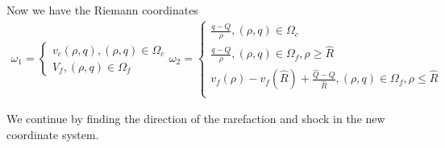 \documentclass{article}
\numberwithin{equation}{section}
\begin{document}
Now we have the Riemann coordinates
\begin{align*}
    \omega_1 = \begin{cases}
    v_c(\rho, q), (\rho, q) \in \Omega_c \\
    V_f, (\rho, q) \in \Omega_f
    \end{cases}
    \omega_2 = \begin{cases}
    \frac{q-Q}{\rho}, (\rho, q) \in \Omega_c \\
    \frac{q-Q}{\rho}, (\rho, q) \in \Omega_f, \rho \geq \hat R \\
    v_f(\rho) - v_f(\hat R) + \frac{\hat Q - Q}{\hat R }, (\rho, q) \in \Omega_f, \rho \leq \hat R \\
    \end{cases}
\end{align*}

We continue by finding the direction of the rarefaction and shock in the new coordinate system. 
\end{document}
